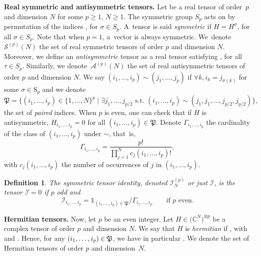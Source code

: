 \documentclass[pdftex]{sigma}
\numberwithin{equation}{section}
\theoremstyle{definition}
\newtheorem{Definition}[Theorem]{Definition}
\begin{document}
{\bf Real symmetric and antisymmetric tensors.}
Let  be a real tensor of order~$p$ and dimension $N$ for some $p\geq 1$, $N\geq 1$. The symmetric group $S_p$ acts on  by permutation of the indices
,
for $\sigma \in S_p$. A~tensor is said {\em symmetric} if
$H=H^{\sigma}$,
for all $\sigma \in S_p$. Note that when $p=1$, a~vector is always symmetric. We~denote~$\mathcal{S}^{(p)}(N)$ the set of real symmetric tensors of order $p$ and dimension $N$. Moreover, we define an {\em antisymmetric} tensor as a real tensor satisfying
,
for all $\tau \in S_p$.
Similarly, we denote~$\mathcal{A}^{(p)}(N)$ the set of real antisymmetric tensors of order $p$ and dimension $N$. We say $(i_1,\dots,i_p) \sim (j_1,\dots,j_p)$ if $\forall k, i_k = j_{\sigma(k)} $ for some $\sigma \in \mathrm{S}_p$ and we denote
\[ \mathfrak{P}=\{(i_1,\dots,i_p) \in \{1,\dots,N\}^p \mid \exists j_1,\dots,j_{p/2} \text{ s.t.\ } (i_1,\dots,i_p) \sim (j_1,j_1,\dots,j_{p/2},j_{p/2}) \}, \]
the set of {\em paired} indices. When $p$ is even, one can check that if $H$ is antisymmetric, $H_{i_1,\dots,i_p}=0$ for all $(i_1,\dots,i_p) \in \mathfrak{P}$. Denote $\Gamma_{i_1,\dots,i_p}$ the cardinality of the class of $(i_1,\dots,i_p)$ under $\sim$, that~is,
\[  \Gamma_{i_1,\dots,i_p} = \frac{p!}{\prod_{j=1}^N c_j(i_1,\dots,i_p)!},\]
with $c_j(i_1,\dots,i_p)$ the number of occurrences of $j$ in $(i_1,\dots,i_p)$.

\begin{Definition}\label{def:identity}
    \em The {\em symmetric tensor identity}, denoted $\mathcal{I}^{(p)}_N$ or just $\mathcal{I}$, is the tensor $\mathcal{I}=0$ if $p$ odd and
\[ \mathcal{I}_{i_1,\dots,i_p} = \mathds{1}_{(i_1,\dots,i_p) \in \mathfrak{P}} / \Gamma_{i_1,\dots,i_p} \qquad \mbox{if } p \mbox{ even.}\]
\end{Definition}

{\bf Hermitian tensors.}
Now, let $p$ be an even integer. Let $H \in \bigl(\mathbb{C}^N\bigr)^{\otimes p}$ be a complex tensor of order $p$ and dimension $N$. We say that $H$ is {\em hermitian} if
,
with~ and . Hence, for any $(i_1,\dots,i_p)\hspace{-0.5pt} \in \hspace{-0.5pt} \mathfrak{P}$, we have in particular . We denote  the set of Hermitian tensors of order $p$ and dimension~$N$.
\end{document}

